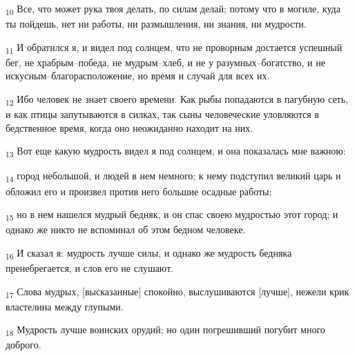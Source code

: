 \begin{tcolorbox}
\textsubscript{10} Все, что может рука твоя делать, по силам делай; потому что в могиле, куда ты пойдешь, нет ни работы, ни размышления, ни знания, ни мудрости.
\end{tcolorbox}
\begin{tcolorbox}
\textsubscript{11} И обратился я, и видел под солнцем, что не проворным достается успешный бег, не храбрым--победа, не мудрым--хлеб, и не у разумных--богатство, и не искусным--благорасположение, но время и случай для всех их.
\end{tcolorbox}
\begin{tcolorbox}
\textsubscript{12} Ибо человек не знает своего времени. Как рыбы попадаются в пагубную сеть, и как птицы запутываются в силках, так сыны человеческие уловляются в бедственное время, когда оно неожиданно находит на них.
\end{tcolorbox}
\begin{tcolorbox}
\textsubscript{13} Вот еще какую мудрость видел я под солнцем, и она показалась мне важною:
\end{tcolorbox}
\begin{tcolorbox}
\textsubscript{14} город небольшой, и людей в нем немного; к нему подступил великий царь и обложил его и произвел против него большие осадные работы;
\end{tcolorbox}
\begin{tcolorbox}
\textsubscript{15} но в нем нашелся мудрый бедняк, и он спас своею мудростью этот город; и однако же никто не вспоминал об этом бедном человеке.
\end{tcolorbox}
\begin{tcolorbox}
\textsubscript{16} И сказал я: мудрость лучше силы, и однако же мудрость бедняка пренебрегается, и слов его не слушают.
\end{tcolorbox}
\begin{tcolorbox}
\textsubscript{17} Слова мудрых, [высказанные] спокойно, выслушиваются [лучше], нежели крик властелина между глупыми.
\end{tcolorbox}
\begin{tcolorbox}
\textsubscript{18} Мудрость лучше воинских орудий; но один погрешивший погубит много доброго.
\end{tcolorbox}
